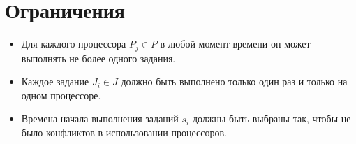 \documentclass{article}
\begin{document}
    \section*{Ограничения}

        \begin{itemize}
            \item Для каждого процессора $P_j \in P$ в любой момент времени он может выполнять не более одного задания.
            \item Каждое задание $J_i \in J$ должно быть выполнено только один раз и только на одном процессоре.
            \item Времена начала выполнения заданий $s_i$ должны быть выбраны так, чтобы не было конфликтов в использовании процессоров.
        \end{itemize}
\end{document}
